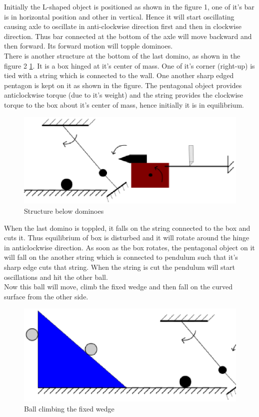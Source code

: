 \documentclass[a4paper,11pt]{article}
\begin{document}
{\indent Initially the L-shaped object is positioned as shown in the figure 1, one of it's bar is in horizontal position and other in vertical. Hence it will start oscillating causing axle to oscillate in anti-clockwise direction first and then in clockwise direction. Thus bar connected at the bottom of the axle will move backward and then forward. Its forward motion will topple dominoes. \\

\indent There is another structure at the bottom of the last domino, as shown in the figure 2 \ref{fig:image1}.  It is a box hinged at it's center of mass. One of it's corner (right-up) is tied with a string which is connected to the wall. One another sharp edged pentagon is kept on it as shown in the figure. The pentagonal object provides anticlockwise torque (due to it's weight) and the string provides the clockwise torque to the box about it's center of mass, hence initially it is in equilibrium. 
\begin{figure}[h]
    \centering
    \label{fig:image1}
    \includegraphics[scale=0.6]{image1}
    \caption{Structure below dominoes}
\end{figure}

\indent When the last domino is toppled, it falls on the string connected to the box and cuts it. Thus equilibrium of box is disturbed and it will rotate around the hinge in anticlockwise direction. As soon as the box rotates, the pentagonal object on it will fall on the another string which is connected to pendulum such that it's sharp edge cuts that string. When the string is cut the pendulum will start oscillations and hit the other ball. \\

\newpage
\indent Now this ball will move, climb the fixed wedge and then fall on the curved surface from the other side.
\begin{figure}[h]
    \centering
    \label{fig:image2}
    \includegraphics[scale=0.4]{image2}
    \caption{Ball climbing the fixed wedge}
\end{figure}


}
\end{document}
